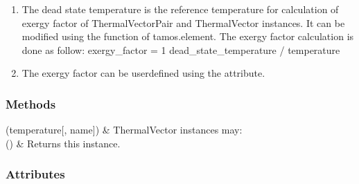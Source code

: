 \documentclass[letterpaper,10pt,english]{sphinxmanual}
\begin{document}
\begin{fulllineitems}
\begin{fulllineitems}
\begin{enumerate}
\item {} 
\sphinxAtStartPar
The dead state temperature is the reference temperature for calculation of exergy factor of ThermalVectorPair and ThermalVector instances.
It can be modified using the  function of tamos.element.
The exergy factor calculation is done as follow:
exergy\_factor = 1 \sphinxhyphen{} dead\_state\_temperature / temperature

\item {} 
\sphinxAtStartPar
The exergy factor can be user\sphinxhyphen{}defined using the  attribute.

\end{enumerate}

\end{fulllineitems}

\subsubsection*{Methods}


\begin{savenotes}\sphinxattablestart
\centering
\begin{tabulary}{\linewidth}[t]{}
\hline

\sphinxAtStartPar
{\hyperref[\detokenize{generated/tamos.element.ThermalVector:tamos.element.ThermalVector.__init__}]{}}(temperature{[}, name{]})
&
\sphinxAtStartPar
ThermalVector instances may:
\\
\hline
\sphinxAtStartPar
{\hyperref[\detokenize{generated/tamos.element.ThermalVector:tamos.element.ThermalVector.get_vectors}]{}}()
&
\sphinxAtStartPar
Returns this instance.
\\
\hline
\end{tabulary}
\par
\sphinxattableend\end{savenotes}
\subsubsection*{Attributes}


\begin{savenotes}\sphinxattablestart
\centering
\begin{tabulary}{\linewidth}[t]{}
\hline


\end{tabulary}
\end{savenotes}
\end{fulllineitems}
\end{document}
